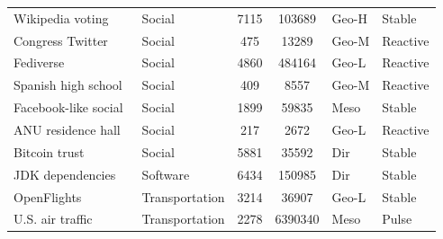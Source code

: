 \documentclass[aps,superscriptaddress,11pt]{revtex4-2}
\theoremstyle{definition}
\theoremstyle{plain}
\begin{document}
\begin{table}[!ht]
\begin{tabular}{llccll}
Wikipedia voting~\cite{snapnets} &
Social & 7115 & 103689 & Geo-H & Stable \\

\addlinespace[2pt]
Congress Twitter~\cite{snapnets} &
Social & 475 & 13289 & Geo-M & Reactive \\

Fediverse~\cite{Peixoto2020} &
Social & 4860 & 484164 & Geo-L & Reactive \\

Spanish high school~\cite{RuizGarcia2023} &
Social & 409 & 8557 & Geo-M & Reactive \\

Facebook-like social~\cite{Opsahl2009} &
Social & 1899 & 59835 & Meso & Stable \\

ANU residence hall~\cite{Freeman1998,Peixoto2020} &
Social & 217 & 2672 & Geo-L & Reactive \\

Bitcoin trust~\cite{Kumar2016,snapnets} &
Social & 5881 & 35592 & Dir & Stable \\

\addlinespace[2pt]
JDK dependencies~\cite{konect} &
Software & 6434 & 150985 & Dir & Stable \\

\addlinespace[2pt]
OpenFlights~\cite{Peixoto2020} &
Transportation & 3214 & 36907 & Geo-L & Stable \\

U.S. air traffic~\cite{Peixoto2020} &
Transportation & 2278 & 6390340 & Meso & Pulse \\

\bottomrule
\end{tabular}
\end{table}
\end{document}
